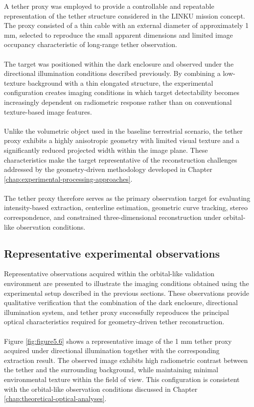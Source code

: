 A tether proxy was employed to provide a controllable and repeatable representation of the tether structure considered in the LINKU mission concept. The proxy consisted of a thin cable with an external diameter of approximately 1 mm, selected to reproduce the small apparent dimensions and limited image occupancy characteristic of long-range tether observation.
\\\\
The target was positioned within the dark enclosure and observed under the directional illumination conditions described previously. By combining a low-texture background with a thin elongated structure, the experimental configuration creates imaging conditions in which target detectability becomes increasingly dependent on radiometric response rather than on conventional texture-based image features.
\\\\
Unlike the volumetric object used in the baseline terrestrial scenario, the tether proxy exhibits a highly anisotropic geometry with limited visual texture and a significantly reduced projected width within the image plane. These characteristics make the target representative of the reconstruction challenges addressed by the geometry-driven methodology developed in Chapter \ref{chap:experimental-processing-approaches}.
\\\\
The tether proxy therefore serves as the primary observation target for evaluating intensity-based extraction, centerline estimation, geometric curve tracking, stereo correspondence, and constrained three-dimensional reconstruction under orbital-like observation conditions.

\subsection{Representative experimental observations}

Representative observations acquired within the orbital-like validation environment are presented to illustrate the imaging conditions obtained using the experimental setup described in the previous sections. These observations provide qualitative verification that the combination of the dark enclosure, directional illumination system, and tether proxy successfully reproduces the principal optical characteristics required for geometry-driven tether reconstruction.
\\\\
Figure \ref{fig:figure5.6} shows a representative image of the 1 mm tether proxy acquired under directional illumination together with the corresponding extraction result. The observed image exhibits high radiometric contrast between the tether and the surrounding background, while maintaining minimal environmental texture within the field of view. This configuration is consistent with the orbital-like observation conditions discussed in Chapter \ref{chap:theoretical-optical-analyses}.

